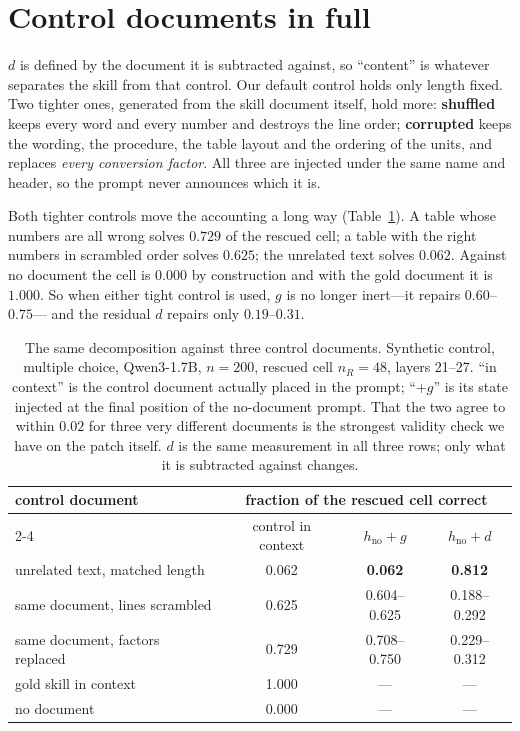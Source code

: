 \documentclass{article}
\newcommand{\dvec}{\ensuremath{d}}
\newcommand{\gvec}{\ensuremath{g}}
\begin{document}
\label{endmain}
\clearpage



\clearpage
\appendix

\section{Control documents in full}
\label{app:controls}

$\dvec$ is defined by the document it is subtracted against, so ``content'' is
whatever separates the skill from that control. Our default control holds only
length fixed. Two tighter ones, generated from the skill document itself, hold
more: \textbf{shuffled} keeps every word and every number and destroys the line
order; \textbf{corrupted} keeps the wording, the procedure, the table layout and
the ordering of the units, and replaces \emph{every conversion factor}. All
three are injected under the same name and header, so the prompt never announces
which it is.

Both tighter controls move the accounting a long way
(Table~\ref{tab:controls}). A table whose numbers are all wrong solves $0.729$
of the rescued cell; a table with the right numbers in scrambled order solves
$0.625$; the unrelated text solves $0.062$. Against no document the cell is
$0.000$ by construction and with the gold document it is $1.000$. So when either
tight control is used, $\gvec$ is no longer inert---it repairs $0.60$--$0.75$---
and the residual $\dvec$ repairs only $0.19$--$0.31$.

\begin{table}[t]
\caption{The same decomposition against three control documents. Synthetic
control, multiple choice, Qwen3-1.7B, $n=200$, rescued cell $n_R=48$, layers
21--27. ``in context'' is the control document actually placed in the prompt;
``$+\gvec$'' is its state injected at the final position of the no-document
prompt. That the two agree to within $0.02$ for three very different documents
is the strongest validity check we have on the patch itself. $\dvec$ is the
same measurement in all three rows; only what it is subtracted against changes.}
\label{tab:controls}
\centering
\small
\begin{tabular}{lccc}
\toprule
control document & \multicolumn{3}{c}{fraction of the rescued cell correct}\\
\cmidrule(lr){2-4}
 & control in context & $h_{\text{no}}+\gvec$ & $h_{\text{no}}+\dvec$ \\
\midrule
unrelated text, matched length      & 0.062 & \textbf{0.062} & \textbf{0.812} \\
same document, lines scrambled      & 0.625 & 0.604--0.625   & 0.188--0.292 \\
same document, factors replaced     & 0.729 & 0.708--0.750   & 0.229--0.312 \\
\midrule
gold skill in context & 1.000 & --- & --- \\
no document           & 0.000 & --- & --- \\
\bottomrule
\end{tabular}
\end{table}
\end{document}
